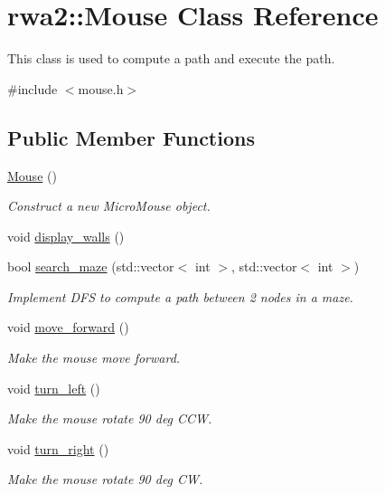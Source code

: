 \hypertarget{classrwa2_1_1_mouse}{}\section{rwa2\+:\+:Mouse Class Reference}
\label{classrwa2_1_1_mouse}


This class is used to compute a path and execute the path.  




{\ttfamily \#include $<$mouse.\+h$>$}

\subsection*{Public Member Functions}
\begin{DoxyCompactItemize}
\item 
\hyperlink{classrwa2_1_1_mouse_a048dffae3aaa3a6ddc2c6cc4741a097c}{Mouse} ()
\begin{DoxyCompactList}\small\item\em Construct a new Micro\+Mouse object. \end{DoxyCompactList}\item 
void \hyperlink{classrwa2_1_1_mouse_abbcc99c41fd073426fdfd790f947956e}{display\+\_\+walls} ()
\item 
bool \hyperlink{classrwa2_1_1_mouse_a4b441e30f6c9d446b901f9b21ba104df}{search\+\_\+maze} (std\+::vector$<$ int $>$, std\+::vector$<$ int $>$)
\begin{DoxyCompactList}\small\item\em Implement D\+FS to compute a path between 2 nodes in a maze. \end{DoxyCompactList}\item 
void \hyperlink{classrwa2_1_1_mouse_afc6e0d56e3a777c05efa3929eb256e0a}{move\+\_\+forward} ()
\begin{DoxyCompactList}\small\item\em Make the mouse move forward. \end{DoxyCompactList}\item 
void \hyperlink{classrwa2_1_1_mouse_a5748e94e740432c334d15364fb476919}{turn\+\_\+left} ()
\begin{DoxyCompactList}\small\item\em Make the mouse rotate 90 deg C\+CW. \end{DoxyCompactList}\item 
void \hyperlink{classrwa2_1_1_mouse_ac929127d86fc4a41d1e216968b1dae20}{turn\+\_\+right} ()
\begin{DoxyCompactList}\small\item\em Make the mouse rotate 90 deg CW. \end{DoxyCompactList}\item 

\end{DoxyCompactItemize}
